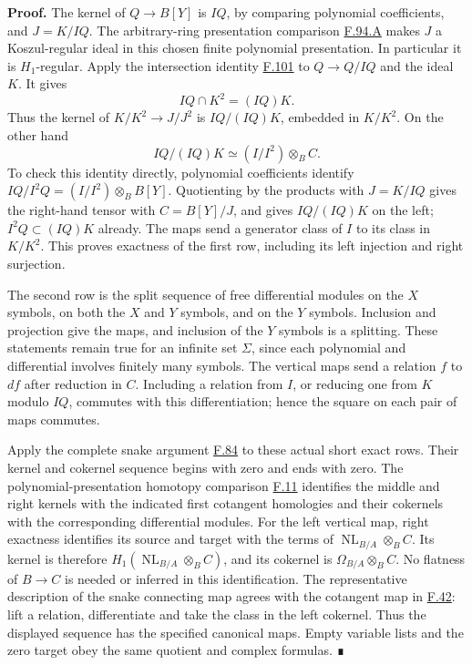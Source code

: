 \documentclass[11pt,a4paper,openany]{report}
\providecommand{\NL}{\operatorname{NL}}
\begin{document}
\textbf{Proof.} The kernel of \(Q\to B[Y]\) is \(IQ\), by comparing polynomial coefficients, and \(J=K/IQ\). The arbitrary-ring presentation comparison \hyperref[AG-RG-S05-more-algebra-lemma-lci-presentation-independent]{F.94.A} makes \(J\) a Koszul-regular ideal in this chosen finite polynomial presentation. In particular it is \(H_1\)-regular. Apply the intersection identity \hyperref[AG-RG-S05-more-algebra-lemma-conormal-sequence-H1-regular-ideal]{F.101} to \(Q\to Q/IQ\) and the ideal \(K\). It gives \[IQ\cap K^2=(IQ)K.\] Thus the kernel of \(K/K^2\to J/J^2\) is \(IQ/(IQ)K\), embedded in \(K/K^2\). On the other hand \[IQ/(IQ)K\simeq (I/I^2)\otimes_B C.\] To check this identity directly, polynomial coefficients identify \(IQ/I^2Q=(I/I^2)\otimes_B B[Y]\). Quotienting by the products with \(J=K/IQ\) gives the right-hand tensor with \(C=B[Y]/J\), and gives \(IQ/(IQ)K\) on the left; \(I^2Q\subset(IQ)K\) already. The maps send a generator class of \(I\) to its class in \(K/K^2\). This proves exactness of the first row, including its left injection and right surjection.

The second row is the split sequence of free differential modules on the \(X\) symbols, on both the \(X\) and \(Y\) symbols, and on the \(Y\) symbols. Inclusion and projection give the maps, and inclusion of the \(Y\) symbols is a splitting. These statements remain true for an infinite set \(\Sigma\), since each polynomial and differential involves finitely many symbols. The vertical maps send a relation \(f\) to \(df\) after reduction in \(C\). Including a relation from \(I\), or reducing one from \(K\) modulo \(IQ\), commutes with this differentiation; hence the square on each pair of maps commutes.

Apply the complete snake argument \hyperref[AG-RG-S05-algebra-lemma-snake]{F.84} to these actual short exact rows. Their kernel and cokernel sequence begins with zero and ends with zero. The polynomial-presentation homotopy comparison \hyperref[AG-RG-S05-algebra-lemma-NL-homotopy]{F.11} identifies the middle and right kernels with the indicated first cotangent homologies and their cokernels with the corresponding differential modules. For the left vertical map, right exactness identifies its source and target with the terms of \(\NL_{B/A}\otimes_B C\). Its kernel is therefore \(H_1(\NL_{B/A}\otimes_B C)\), and its cokernel is \(\Omega_{B/A}\otimes_B C\). No flatness of \(B\to C\) is needed or inferred in this identification. The representative description of the snake connecting map agrees with the cotangent map in \hyperref[AG-RG-S05-algebra-lemma-exact-sequence-NL]{F.42}: lift a relation, differentiate and take the class in the left cokernel. Thus the displayed sequence has the specified canonical maps. Empty variable lists and the zero target obey the same quotient and complex formulas. ∎
\end{document}
